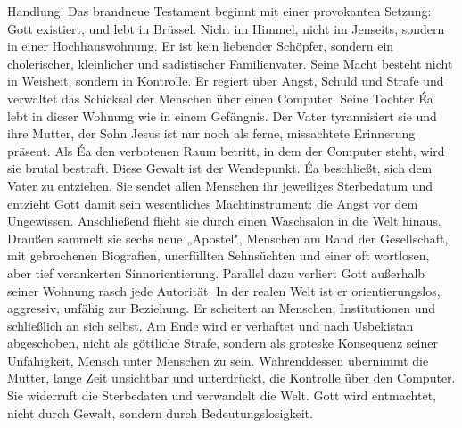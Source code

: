\documentclass[
  ngerman,
]{article}
\begin{document}
Handlung: Das brandneue Testament beginnt mit einer provokanten Setzung:
Gott existiert, und lebt in Brüssel. Nicht im Himmel, nicht im Jenseits,
sondern in einer Hochhauswohnung. Er ist kein liebender Schöpfer,
sondern ein cholerischer, kleinlicher und sadistischer Familienvater.
Seine Macht besteht nicht in Weisheit, sondern in Kontrolle. Er regiert
über Angst, Schuld und Strafe und verwaltet das Schicksal der Menschen
über einen Computer. Seine Tochter Éa lebt in dieser Wohnung wie in
einem Gefängnis. Der Vater tyrannisiert sie und ihre Mutter, der Sohn
Jesus ist nur noch als ferne, missachtete Erinnerung präsent. Als Éa den
verbotenen Raum betritt, in dem der Computer steht, wird sie brutal
bestraft. Diese Gewalt ist der Wendepunkt. Éa beschließt, sich dem Vater
zu entziehen. Sie sendet allen Menschen ihr jeweiliges Sterbedatum und
entzieht Gott damit sein wesentliches Machtinstrument: die Angst vor dem
Ungewissen. Anschließend flieht sie durch einen Waschsalon in die Welt
hinaus. Draußen sammelt sie sechs neue „Apostel", Menschen am Rand der
Gesellschaft, mit gebrochenen Biografien, unerfüllten Sehnsüchten und
einer oft wortlosen, aber tief verankerten Sinnorientierung. Parallel
dazu verliert Gott außerhalb seiner Wohnung rasch jede Autorität. In der
realen Welt ist er orientierungslos, aggressiv, unfähig zur Beziehung.
Er scheitert an Menschen, Institutionen und schließlich an sich selbst.
Am Ende wird er verhaftet und nach Usbekistan abgeschoben, nicht als
göttliche Strafe, sondern als groteske Konsequenz seiner Unfähigkeit,
Mensch unter Menschen zu sein. Währenddessen übernimmt die Mutter, lange
Zeit unsichtbar und unterdrückt, die Kontrolle über den Computer. Sie
widerruft die Sterbedaten und verwandelt die Welt. Gott wird entmachtet,
nicht durch Gewalt, sondern durch Bedeutungslosigkeit.
\end{document}
